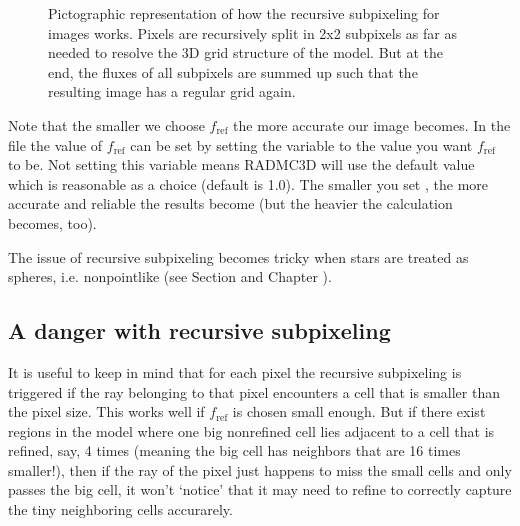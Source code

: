 \documentclass[letterpaper,10pt,english]{sphinxmanual}
\begin{document}
\begin{figure}[htbp]
\centering
\capstart

\noindent{}
\caption{Pictographic representation of how the recursive sub\sphinxhyphen{}pixeling for images
works. Pixels are recursively split in 2x2 subpixels as far as needed
to resolve the 3\sphinxhyphen{}D grid structure of the model. But at the end, the
fluxes of all subpixels are summed up such that the resulting image
has a regular grid again.}\label{\detokenize{imagesspectra:id5}}\label{\detokenize{imagesspectra:fig-recursive-subpixeling}}\end{figure}

Note that the smaller we choose \(f_{\mathrm{ref}}\) the more accurate our
image becomes. In the  file the value of \(f_{\mathrm{ref}}\)
can be set by setting the variable  to the
value you want \(f_{\mathrm{ref}}\) to be. Not setting this variable means
RADMC\sphinxhyphen{}3D will use the default value which is reasonable as a choice (default
is 1.0). The smaller you set , the
more accurate and reliable the results become (but the heavier the calculation
becomes, too).

 The issue of recursive sub\sphinxhyphen{}pixeling becomes tricky when stars
are treated as spheres, i.e. non\sphinxhyphen{}point\sphinxhyphen{}like (see Section
{\hyperref[\detokenize{imagesspectra:sec-image-stars}]{}} and Chapter {\hyperref[\detokenize{stars:chap-stars}]{}}).


\subsection{A danger with recursive sub\sphinxhyphen{}pixeling}
\label{\detokenize{imagesspectra:a-danger-with-recursive-sub-pixeling}}
It is useful to keep in mind that for each pixel the recursive sub\sphinxhyphen{}pixeling
is triggered if the ray belonging to that pixel encounters a cell that is
smaller than the pixel size. This  works well if
\(f_{\mathrm{ref}}\) is chosen small enough. But if there exist regions in the
model where one big non\sphinxhyphen{}refined cell lies adjacent to a cell that is
refined, say, 4 times (meaning the big cell has neighbors that are 16 times
smaller!), then if the ray of the pixel just happens to miss the small cells
and only passes the big cell, it won’t ‘notice’ that it may need to refine
to correctly capture the tiny neighboring cells accurarely.
\end{document}
